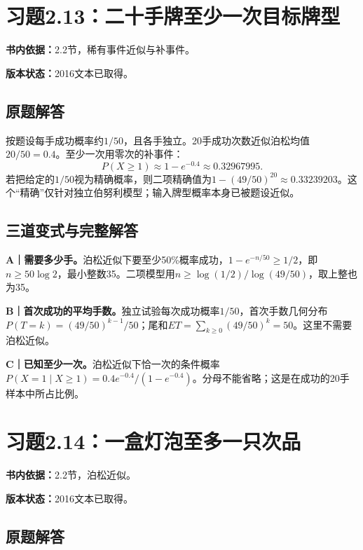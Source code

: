 \documentclass[
  11pt,
  a4paper,
  UTF8,fontset=fandol]{ctexart}
\let\OldSection\section
\renewcommand{\section}{\Needspace{7\baselineskip}\OldSection}
\let\OldSubsection\subsection
\renewcommand{\subsection}{\Needspace{5\baselineskip}\OldSubsection}
\begin{document}
\newpage

\section{习题2.13：二十手牌至少一次目标牌型}\label{ux4e60ux98982.13ux4e8cux5341ux624bux724cux81f3ux5c11ux4e00ux6b21ux76eeux6807ux724cux578b}

\textbf{书内依据：}2.2节，稀有事件近似与补事件。

\textbf{版本状态：}2016文本已取得。

\subsection{原题解答}\label{ux539fux9898ux89e3ux7b54-12}

按题设每手成功概率约\(1/50\)，且各手独立。20手成功次数近似泊松均值\(20/50=0.4\)。至少一次用零次的补事件：
\[\boxed{P(X\ge1)\approx1-e^{-0.4}\approx0.32967995.}\]
若把给定的\(1/50\)视为精确概率，则二项精确值为\(1-(49/50)^{20}\approx0.33239203\)。这个``精确''仅针对独立伯努利模型；输入牌型概率本身已被题设近似。

\subsection{三道变式与完整解答}\label{ux4e09ux9053ux53d8ux5f0fux4e0eux5b8cux6574ux89e3ux7b54-12}

\textbf{A｜需要多少手。}泊松近似下要至少50\%概率成功，\(1-e^{-n/50}\ge1/2\)，即\(n\ge50\log2\)，最小整数35。二项模型用\(n\ge\log(1/2)/\log(49/50)\)，取上整也为35。

\textbf{B｜首次成功的平均手数。}独立试验每次成功概率\(1/50\)，首次手数几何分布\(P(T=k)=(49/50)^{k-1}/50\)；尾和\(ET=\sum_{k\ge0}(49/50)^k=50\)。这里不需要泊松近似。

\textbf{C｜已知至少一次。}泊松近似下恰一次的条件概率\(P(X=1\mid X\ge1)=0.4e^{-0.4}/(1-e^{-0.4})\)。分母不能省略；这是在成功的20手样本中所占比例。

\newpage

\section{习题2.14：一盒灯泡至多一只次品}\label{ux4e60ux98982.14ux4e00ux76d2ux706fux6ce1ux81f3ux591aux4e00ux53eaux6b21ux54c1}

\textbf{书内依据：}2.2节，泊松近似。

\textbf{版本状态：}2016文本已取得。

\subsection{原题解答}\label{ux539fux9898ux89e3ux7b54-13}
\end{document}
